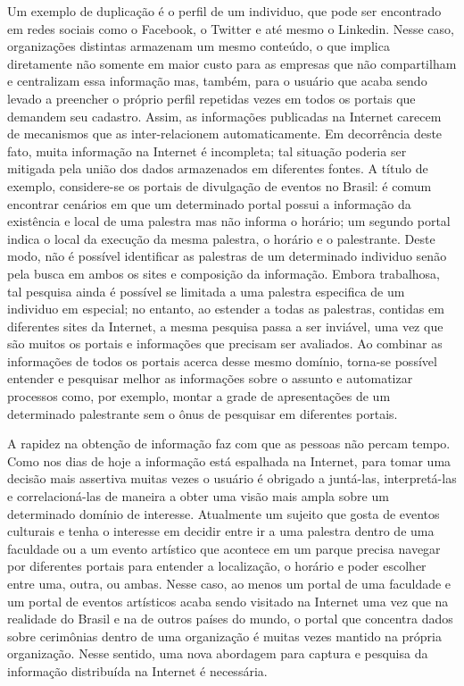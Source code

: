 Um exemplo de duplicação é o perfil de um individuo, que pode ser encontrado em redes sociais como o Facebook, o Twitter e até mesmo o Linkedin. Nesse caso, organizações distintas armazenam um mesmo conteúdo, o que implica diretamente não somente em maior custo para as empresas que não compartilham e centralizam essa informação mas, também, para o usuário que acaba sendo levado a preencher o próprio perfil repetidas vezes em todos os portais que demandem seu cadastro. 
Assim, as informações publicadas na Internet carecem de mecanismos que as inter-relacionem automaticamente. Em decorrência deste fato, muita informação na Internet é incompleta; tal situação poderia ser mitigada pela união dos dados armazenados em diferentes fontes. A título de exemplo, considere-se os portais de divulgação de eventos no Brasil: é comum encontrar cenários em que um determinado portal possui a informação da existência e local de uma palestra mas não informa o horário; um segundo portal indica o local da execução da mesma palestra, o horário e o palestrante. Deste modo, não é possível identificar as palestras de um determinado individuo senão pela busca em ambos os sites e composição da informação. Embora trabalhosa, tal pesquisa ainda é possível se limitada a uma palestra especifica de um individuo em especial; no entanto, ao estender a todas as palestras, contidas em diferentes sites da Internet, a mesma pesquisa passa a ser inviável, uma vez que são muitos os portais e informações que precisam ser avaliados. Ao combinar as informações de todos os portais acerca desse mesmo domínio, torna-se possível entender e pesquisar melhor as informações sobre o assunto e automatizar processos como, por exemplo, montar a grade de apresentações de um determinado palestrante sem o ônus de pesquisar em diferentes portais.

A rapidez na obtenção de informação faz com que as pessoas não percam tempo. Como nos dias de hoje a informação está espalhada na Internet, para tomar uma decisão mais assertiva muitas vezes o usuário é obrigado a juntá-las, interpretá-las e correlacioná-las de maneira a obter uma visão mais ampla sobre um determinado domínio de interesse. Atualmente um sujeito que gosta de eventos culturais e tenha o interesse em decidir entre ir a uma palestra dentro de uma faculdade ou a um evento artístico que acontece em um parque precisa navegar por diferentes portais para entender a localização, o horário e poder escolher entre uma, outra, ou ambas. Nesse caso, ao menos um portal de uma faculdade e um portal de eventos artísticos acaba sendo visitado na Internet uma vez que na realidade do Brasil e na de outros países do mundo, o portal que concentra dados sobre cerimônias dentro de uma organização é muitas vezes mantido na própria organização. Nesse sentido, uma nova abordagem para captura e pesquisa da informação distribuída na Internet é necessária.

